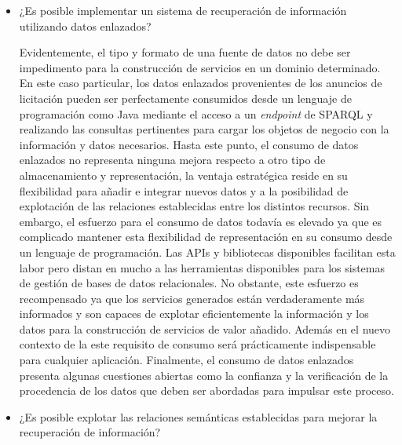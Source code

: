 \begin{itemize}
 \item ¿Es posible implementar un sistema de recuperación de información utilizando datos enlazados?

Evidentemente, el tipo y formato de una fuente de datos no debe ser impedimento para la construcción de servicios 
en un dominio determinado. En este caso particular, los datos enlazados provenientes de los anuncios de licitación 
pueden ser perfectamente consumidos desde un lenguaje de programación como Java mediante el acceso a un 
\textit{endpoint} de \gls{SPARQL} y realizando las consultas pertinentes para cargar los objetos de negocio con la 
información y datos necesarios. Hasta este punto, el consumo de datos enlazados no representa ninguna mejora 
respecto a otro tipo de almacenamiento y representación, la ventaja estratégica reside en su flexibilidad 
para añadir e integrar nuevos datos y a la posibilidad de explotación de las relaciones establecidas entre los distintos 
recursos. Sin embargo, el esfuerzo para el consumo de datos todavía es elevado ya que es complicado mantener esta 
flexibilidad de representación en su consumo desde un lenguaje de programación. Las APIs y bibliotecas disponibles 
facilitan esta labor pero distan en mucho a las herramientas disponibles para los sistemas de gestión de bases 
de datos relacionales. No obstante, este esfuerzo es recompensado ya que los servicios generados están verdaderamente 
más informados y son capaces de explotar eficientemente la información y los datos para la construcción de servicios 
de valor añadido. Además en el nuevo contexto de la \wode este requisito de consumo será prácticamente indispensable 
para cualquier aplicación. Finalmente, el consumo de datos enlazados presenta algunas cuestiones abiertas como la 
confianza y la verificación de la procedencia de los datos que deben ser abordadas para impulsar este proceso.


 \item ¿Es posible explotar las relaciones semánticas establecidas para mejorar la recuperación de información?


\end{itemize}
